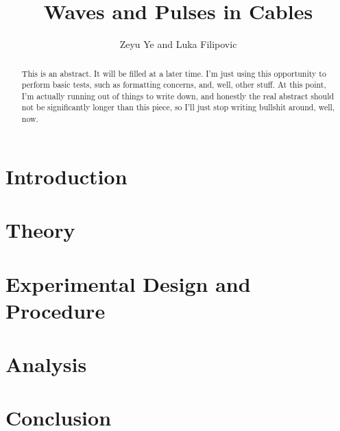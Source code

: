 \documentclass[letterpaper, 10pt, conference]{ieeeconf}
\title{\LARGE \bf Waves and Pulses in Cables}
\author{Zeyu Ye and Luka Filipovic}
\numberwithin{equation}{section}
\begin{document}
\maketitle
\thispagestyle{empty}
\pagestyle{empty}

\begin{abstract}
This is an abstract. It will be filled at a later time. I'm just using this opportunity to perform basic tests, such as formatting concerns, and, well, other stuff. At this point, I'm actually running out of things to write down, and honestly the real abstract should not be significantly longer than this piece, so I'll just stop writing bullshit around, well, now.
\end{abstract}

\section{Introduction}


\section{Theory\label{sec:theory}}


\section{Experimental Design and Procedure}


\section{Analysis}


\section{Conclusion}


\printbibliography
\end{document}
